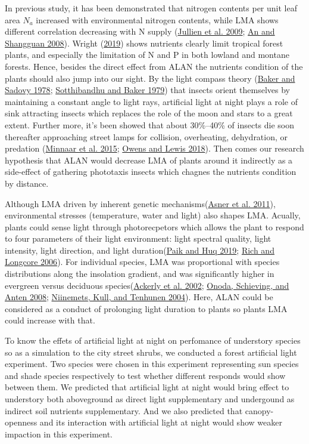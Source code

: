 \documentclass[
]{article}
\begin{document}
In previous study, it has been demonstrated that nitrogen contents per
unit leaf area \(N_a\) increased with environmental nitrogen contents,
while LMA shows different correlation decreasing with N supply
(\protect\hyperlink{ref-Jullien2009}{Jullien et al. 2009};
\protect\hyperlink{ref-An2008}{An and Shangguan 2008}). Wright
(\protect\hyperlink{ref-Wright2019}{2019}) shows nutrients clearly limit
tropical forest plants, and especially the limitation of N and P in both
lowland and montane forests. Hence, besides the direct effect from ALAN
the nutrients condition of the plants should also jump into our sight.
By the light compass theory (\protect\hyperlink{ref-Baker1978}{Baker and
Sadovy 1978}; \protect\hyperlink{ref-Sotthibandhu1979}{Sotthibandhu and
Baker 1979}) that insects orient themselves by maintaining a constant
angle to light rays, artificial light at night plays a role of sink
attracting insects which replaces the role of the moon and stars to a
great extent. Further more, it's been showed that about 30\%--40\% of
insects die soon thereafter approaching street lamps for collision,
overheating, dehydration, or predation
(\protect\hyperlink{ref-Minnaar2015}{Minnaar et al. 2015};
\protect\hyperlink{ref-Owens2018}{Owens and Lewis 2018}). Then comes our
research hypothesis that ALAN would decrease LMA of plants around it
indirectly as a side-effect of gathering phototaxis insects which
chagnes the nutrients condition by distance.

Although LMA driven by inherent genetic
mechanisms(\protect\hyperlink{ref-Asner2011}{Asner et al. 2011}),
environmental stresses (temperature, water and light) also shapes LMA.
Acually, plants could sense light through photorecpetors which allows
the plant to respond to four parameters of their light environment:
light spectral quality, light intensity, light direction, and light
duration(\protect\hyperlink{ref-Paik2019}{Paik and Huq 2019};
\protect\hyperlink{ref-Rich2006}{Rich and Longcore 2006}). For
individual species, LMA was proportional with species distributions
along the insolation gradient, and was significantly higher in evergreen
versus deciduous species(\protect\hyperlink{ref-Ackerly2002}{Ackerly et
al. 2002}; \protect\hyperlink{ref-Onoda2008}{Onoda, Schieving, and Anten
2008}; \protect\hyperlink{ref-Niinemets2004}{Niinemets, Kull, and
Tenhunen 2004}). Here, ALAN could be considered as a conduct of
prolonging light duration to plants so plants LMA could increase with
that.

To know the effets of artificial light at night on perfomance of
understory species so as a simulation to the city street shrubs, we
conducted a forest artificial light experiment. Two species were chosen
in this experiment representing sun species and shade species
respectively to test whether different responds would show between them.
We predicted that artificial light at night would bring effect to
understory both aboveground as direct light supplementary and undergound
as indirect soil nutrients supplementary. And we also predicted that
canopy-openness and its interaction with artificial light at night would
show weaker impaction in this experiment.
\end{document}
